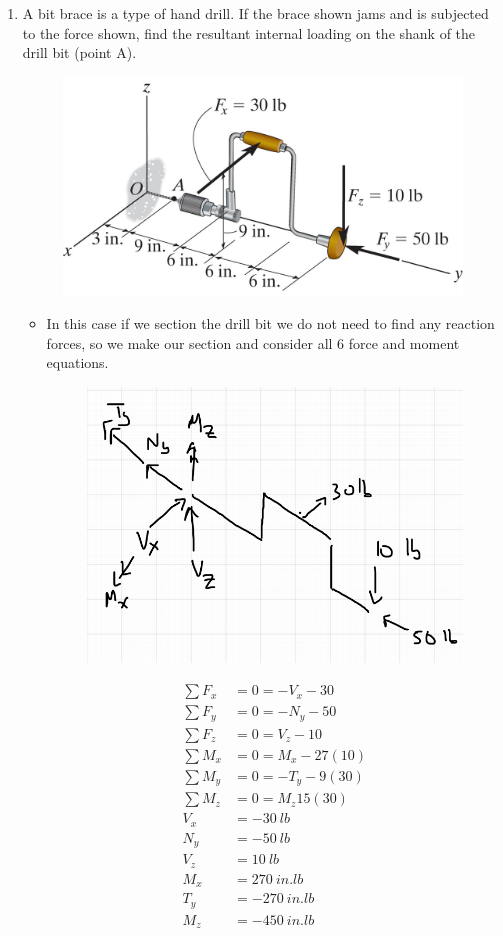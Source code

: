 \documentclass[12pt, oneside]{article}
\let\US\SI
\begin{document}
\begin{enumerate}
	\item %
		A bit brace is a type of hand drill.
		If the brace shown jams and is subjected to the force shown, find the resultant internal loading on the shank of the drill bit (point A).
		\begin{figure}[H]
			\centering
			\includegraphics[width=0.6\linewidth]{brace}
			\label{fig:brace}
		\end{figure}
		\begin{itemize}
			\item In this case if we section the drill bit we do not need to find any reaction forces, so we make our section and consider all 6 force and moment equations.
			\begin{figure}[H]
				\centering
				\includegraphics[width=0.7\linewidth]{hw1-3}
			\end{figure}
			\begin{align*}
				\sum F_x &= 0 = -V_x - 30\\
				\sum F_y &= 0 = -N_y - 50\\
				\sum F_z &= 0 = V_z - 10\\
				\sum M_x &= 0 = M_x - 27(10)\\
				\sum M_y &= 0 = -T_y -9(30)\\
				\sum M_z &= 0 = M_z 15(30)\\
				V_x &= \US{-30}{lb}\\
				N_y &= \US{-50}{lb}\\
				V_z &= \US{10}{lb}\\
				M_x &= \US{270}{in.lb}\\
				T_y &= \US{-270}{in.lb}\\
				M_z &= \US{-450}{in.lb}\\
			\end{align*}
		\end{itemize}


\end{enumerate}
\end{document}
